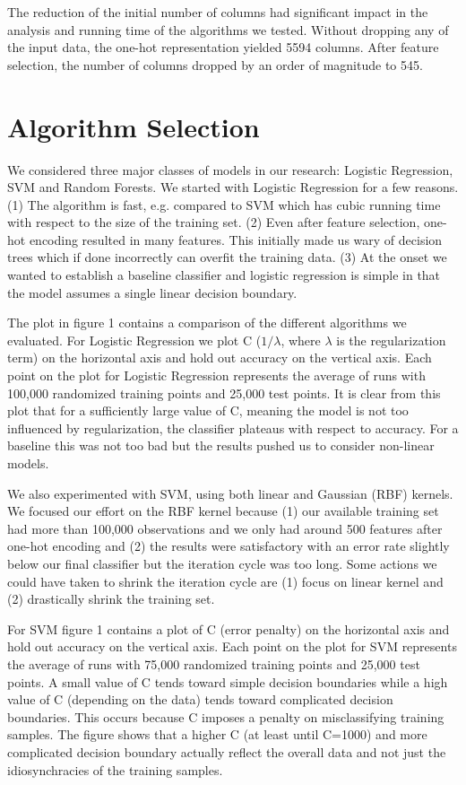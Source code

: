 \documentclass[twoside,11pt]{homework}
\begin{document}
The reduction of the initial number of columns had significant impact in the analysis and running time of the algorithms we tested. Without dropping any of the input data, the one-hot representation yielded 5594 columns. After feature selection, the number of columns dropped by an order of magnitude to 545.  


\section*{Algorithm Selection}



We considered three major classes of models in our research: Logistic Regression,
SVM and Random Forests. We started with Logistic Regression for a few reasons.
(1) The algorithm is fast, e.g. compared to SVM which has cubic running time with respect to the size of the training set.
(2) Even after feature selection, one-hot encoding resulted in 
many features. This initially made us wary of decision trees which if done 
incorrectly can overfit the training data.
(3) At the onset we wanted to establish a baseline classifier and logistic regression is simple in that the model assumes a single linear 
decision boundary. 

The plot in figure 1 contains a comparison of the different algorithms we evaluated. 
For Logistic Regression we plot C ($1/\lambda$, where $\lambda$ is the regularization term) on the horizontal axis and hold out accuracy on the vertical axis.
Each point on the plot for Logistic Regression represents the average of runs with 100,000 randomized training points and 25,000 test points.
It is clear from this plot that for a sufficiently large value of C, meaning the model is not too influenced by regularization,
the classifier plateaus with respect to accuracy. For a baseline this was not too bad but the results pushed us
to consider non-linear models. 

We also experimented with SVM, using both linear and Gaussian (RBF) kernels. We 
focused our effort on the RBF kernel because (1) our available training set had more 
than 100,000 observations and we only had around 500 features after one-hot 
encoding and (2) the results were satisfactory with an error rate slightly below 
our final classifier but the iteration cycle was too long. Some actions we could have 
taken to shrink the iteration cycle are (1) focus on linear kernel and (2) drastically 
shrink the training set.

For SVM figure 1 contains a plot of C (error penalty) on the horizontal axis and hold out accuracy on the vertical axis.
Each point on the plot for SVM represents the average of runs with 75,000 randomized training points and 25,000 test points.
A small value of C tends toward simple decision boundaries while a high value of C (depending on the data) tends toward complicated
decision boundaries. This occurs because C imposes a penalty on misclassifying training samples.
The figure shows that a higher C (at least until C=1000) and more complicated decision boundary actually reflect the overall data
and not just the idiosynchracies of the training samples.
\end{document}
